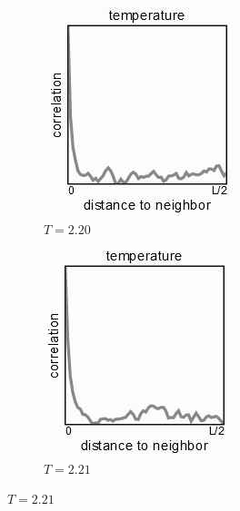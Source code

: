 \documentclass[]{article}
\begin{document}
\begin{figure}[H]
	\caption{Correlation  $R<T_c$}\label{fig:correlation2}
	\begin{subfigure}[t]{0.24\textwidth}
		\caption{$T=2.20$}
		\includegraphics[width=\textwidth]{ising-correlation-20}
	\end{subfigure}
	\begin{subfigure}[t]{0.24\textwidth}
		\caption{$T=2.21$}
		\includegraphics[width=\textwidth]{ising-correlation-21}

\end{subfigure}
\end{figure}
\end{document}
